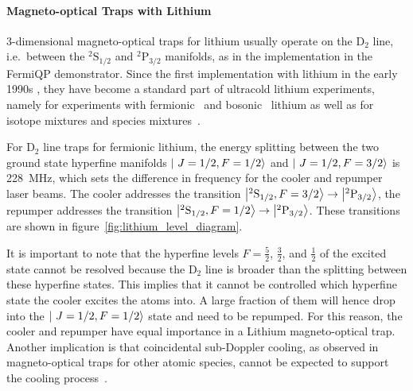 \paragraph{Magneto-optical Traps with Lithium}
3-dimensional magneto-optical traps for lithium usually operate on the D$_2$ line, i.e.~between the $^2\text{S}_{1/2}$ and $^2\text{P}_{3/2}$ manifolds, as in the implementation in the FermiQP demonstrator. Since the first implementation with lithium in the early 1990s \cite{kawanaka_decay_1993}, they have become a standard part of ultracold lithium experiments, namely for experiments with fermionic~\cite{duarte_all-optical_2011,omran_microscopic_2015} and bosonic~\cite{kawanaka_decay_1993,schunemann_magneto-optic_1998} lithium as well as for isotope mixtures \cite{mewes_simultaneous_1999, schreck_sympathetic_2001, hilker_laser_2012, kerkmann_novel_2019} and species mixtures~\cite{ladouceur_compact_2009,tiecke_high-flux_2009,chen_lithium-cesium_2021}.

For D$_2$ line traps for fermionic lithium, the energy splitting between the two ground state hyperfine manifolds $\Ket{~J=1/2, F=1/2}$ and $\Ket{~J=1/2, F=3/2}$ is \SI{228}{\mega\hertz}, which sets the difference in frequency for the cooler and repumper laser beams. The cooler addresses the transition $\Ket{^2\text{S}_{1/2}, F = 3/2} \rightarrow \Ket{^2\text{P}_{3/2}}$, the repumper addresses the transition $\Ket{^2\text{S}_{1/2}, F = 1/2} \rightarrow \Ket{^2\text{P}_{3/2}}$. These transitions are shown in figure~\ref{fig:lithium_level_diagram}.

It is important to note that the hyperfine levels $F = \frac{5}{2}$, $\frac{3}{2}$, and $\frac{1}{2}$ of the excited state cannot be resolved because the D$_2$ line is broader than the splitting between these hyperfine states. This implies that it cannot be controlled which hyperfine state the cooler excites the atoms into. A large fraction of them will hence drop into the $\Ket{~J=1/2, F=1/2}$ state and need to be repumped. For this reason, the cooler and repumper have equal importance in a Lithium magneto-optical trap. Another implication is that coincidental sub-Doppler cooling, as observed in magneto-optical traps for other atomic species, cannot be expected to support the cooling process~\cite{grier_lambda-enhanced_2013}.

